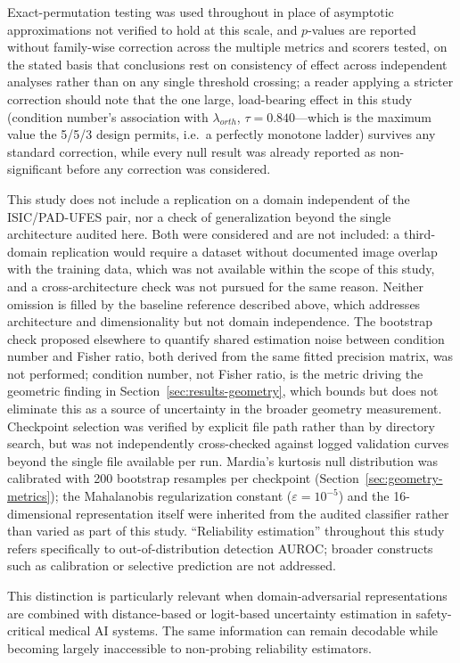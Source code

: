 Exact-permutation testing was used throughout in place of asymptotic approximations not verified to hold at this scale, and $p$-values are reported without family-wise correction across the multiple metrics and scorers tested, on the stated basis that conclusions rest on consistency of effect across independent analyses rather than on any single threshold crossing; a reader applying a stricter correction should note that the one large, load-bearing effect in this study (condition number's association with $\lambda_{orth}$, $\tau=0.840$---which is the maximum value the 5/5/3 design permits, i.e.\ a perfectly monotone ladder) survives any standard correction, while every null result was already reported as non-significant before any correction was considered.

This study does not include a replication on a domain independent of the ISIC/PAD-UFES pair, nor a check of generalization beyond the single architecture audited here. Both were considered and are not included: a third-domain replication would require a dataset without documented image overlap with the training data, which was not available within the scope of this study, and a cross-architecture check was not pursued for the same reason. Neither omission is filled by the baseline reference described above, which addresses architecture and dimensionality but not domain independence. The bootstrap check proposed elsewhere to quantify shared estimation noise between condition number and Fisher ratio, both derived from the same fitted precision matrix, was not performed; condition number, not Fisher ratio, is the metric driving the geometric finding in Section~\ref{sec:results-geometry}, which bounds but does not eliminate this as a source of uncertainty in the broader geometry measurement. Checkpoint selection was verified by explicit file path rather than by directory search, but was not independently cross-checked against logged validation curves beyond the single file available per run. Mardia's kurtosis null distribution was calibrated with 200 bootstrap resamples per checkpoint (Section~\ref{sec:geometry-metrics}); the Mahalanobis regularization constant ($\varepsilon=10^{-5}$) and the 16-dimensional representation itself were inherited from the audited classifier rather than varied as part of this study. ``Reliability estimation'' throughout this study refers specifically to out-of-distribution detection AUROC; broader constructs such as calibration or selective prediction are not addressed.

This distinction is particularly relevant when domain-adversarial representations are combined with distance-based or logit-based uncertainty estimation in safety-critical medical AI systems. The same information can remain decodable while becoming largely inaccessible to non-probing reliability estimators.
